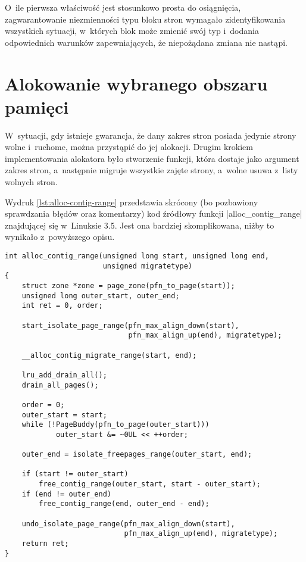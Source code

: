 O~ile pierwsza właściwość jest stosunkowo prosta do osiągnięcia,
zagwarantowanie niezmienności typu bloku stron wymagało
zidentyfikowania wszystkich sytuacji, w~których blok może zmienić swój
typ i~dodania odpowiednich warunków zapewniających, że niepożądana
zmiana nie nastąpi.

\section{Alokowanie wybranego obszaru pamięci}\label{sec:alloc-contig-range}

W~sytuacji, gdy istnieje gwarancja, że dany zakres stron posiada
jedynie strony wolne i~ruchome, można przystąpić do jej alokacji.
Drugim krokiem implementowania alokatora  było stworzenie funkcji,
która dostaje jako argument zakres stron, a~następnie migruje
wszystkie zajęte strony, a~wolne usuwa z~listy wolnych stron.

Wydruk \ref{lst:alloc-contig-range} przedstawia skrócony (bo
pozbawiony sprawdzania błędów oraz komentarzy) kod źródłowy funkcji
\code|alloc_contig_range| znajdującej się w~Linuksie 3.5.  Jest ona
bardziej skomplikowana, niżby to wynikało z~powyższego opisu.

\begin{lstlisting}[float=tb,caption=Skrócony wydruk funkcji
    \code|alloc_conting_range| z Linuksa 3.5.,label=lst:alloc-contig-range]
int alloc_contig_range(unsigned long start, unsigned long end,
                       unsigned migratetype)
{
	struct zone *zone = page_zone(pfn_to_page(start));
	unsigned long outer_start, outer_end;
	int ret = 0, order;

	start_isolate_page_range(pfn_max_align_down(start),
	                         pfn_max_align_up(end), migratetype);

	__alloc_contig_migrate_range(start, end);

	lru_add_drain_all();
	drain_all_pages();

	order = 0;
	outer_start = start;
	while (!PageBuddy(pfn_to_page(outer_start)))
	        outer_start &= ~0UL << ++order;

	outer_end = isolate_freepages_range(outer_start, end);

	if (start != outer_start)
		free_contig_range(outer_start, start - outer_start);
	if (end != outer_end)
		free_contig_range(end, outer_end - end);

	undo_isolate_page_range(pfn_max_align_down(start),
	                        pfn_max_align_up(end), migratetype);
	return ret;
}
\end{lstlisting}

